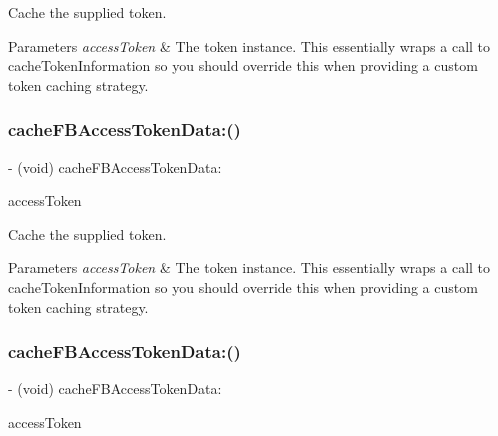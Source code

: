 Cache the supplied token. 
\begin{DoxyParams}{Parameters}
{\em access\+Token} & The token instance.  This essentially wraps a call to {\ttfamily cache\+Token\+Information} so you should override this when providing a custom token caching strategy. \\
\hline
\end{DoxyParams}
\mbox{\label{interfaceFBSessionTokenCachingStrategy_a35d668a867fcc88c491bb8d0c815c9f9}} 
\subsubsection{\texorpdfstring{cache\+F\+B\+Access\+Token\+Data\+:()}{cacheFBAccessTokenData:()}\hspace{0.1cm}{\footnotesize\ttfamily [2/5]}}
{\footnotesize\ttfamily -\/ (void) cache\+F\+B\+Access\+Token\+Data\+: \begin{DoxyParamCaption}\item[{(\hyperlink{interfaceFBAccessTokenData}{F\+B\+Access\+Token\+Data} $\ast$)}]{access\+Token }\end{DoxyParamCaption}}

Cache the supplied token. 
\begin{DoxyParams}{Parameters}
{\em access\+Token} & The token instance.  This essentially wraps a call to {\ttfamily cache\+Token\+Information} so you should override this when providing a custom token caching strategy. \\
\hline
\end{DoxyParams}
\mbox{\label{interfaceFBSessionTokenCachingStrategy_a35d668a867fcc88c491bb8d0c815c9f9}} 
\subsubsection{\texorpdfstring{cache\+F\+B\+Access\+Token\+Data\+:()}{cacheFBAccessTokenData:()}\hspace{0.1cm}{\footnotesize\ttfamily [3/5]}}
{\footnotesize\ttfamily -\/ (void) cache\+F\+B\+Access\+Token\+Data\+: \begin{DoxyParamCaption}\item[{(\hyperlink{interfaceFBAccessTokenData}{F\+B\+Access\+Token\+Data} $\ast$)}]{access\+Token }\end{DoxyParamCaption}}

